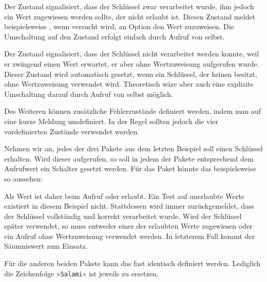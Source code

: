 Der Zustand 
signalisiert, dass der Schlüssel zwar verarbeitet wurde, ihm jedoch ein Wert
zugewiesen werden sollte, der nicht erlaubt ist. Diesen Zustand meldet
beispielsweise \hyperref[cha:typearea]{}, wenn versucht
wird, an Option  den Wert 
zuzuweisen. Die Umschaltung auf den Zustand erfolgt einfach durch Aufruf von
 selbst.

Der Zustand
signalisiert, dass der Schlüssel nicht verarbeitet werden konnte, weil er
zwingend einen Wert erwartet, er aber ohne Wertzuweisung aufgerufen
wurde. Dieser Zustand wird automatisch gesetzt, wenn ein Schlüssel, der keinen
 besitzt, ohne Wertzuweisung verwendet wird. Theoretisch
wäre aber auch eine explizite Umschaltung darauf durch Aufruf von
 selbst möglich.

Des Weiteren können zusätzliche Fehlerzustände definiert
werden, indem man  auf eine kurze Meldung
umdefiniert. In der Regel sollten jedoch die vier vordefinierten Zustände
verwendet werden.

\begin{Example}
  Nehmen wir an, jedes der drei Pakete aus dem letzten Beispiel soll einen
  Schlüssel  erhalten. Wird dieser aufgerufen, so soll in
  jedem der Pakete entsprechend dem Aufrufwert ein Schalter gesetzt
  werden. Für das Paket  könnte das beispielsweise so
  aussehen:
  Als Wert ist daher beim Aufruf  oder 
  erlaubt. Ein Test auf unerlaubte Werte existiert in diesem Beispiel
  nicht. Stattdessen wird immer zurückgemeldet, dass der Schlüssel vollständig
  und korrekt verarbeitet wurde. Wird der Schlüssel später verwendet, so muss
  entweder einer der erlaubten Werte zugewiesen oder ein Aufruf ohne
  Wertzuweisung verwendet werden. In letzterem Fall kommt der Säumniswert
   zum Einsatz.

  Für die anderen beiden Pakete kann das fast identisch definiert
  werden. Lediglich die Zeichenfolge »\texttt{Salami}« ist jeweils zu
  ersetzen.
\end{Example}
%
\EndIndexGroup
\ExampleEndFix


